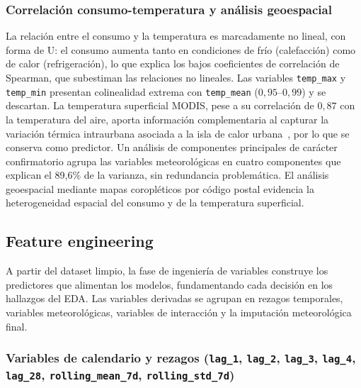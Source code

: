 \documentclass[12pt, a4paper]{article}
\begin{document}
\subsubsection{Correlación consumo-temperatura y análisis geoespacial}

La relación entre el consumo y la temperatura es marcadamente no lineal, con forma de U: el consumo aumenta tanto en condiciones de frío (calefacción) como de calor (refrigeración), lo que explica los bajos coeficientes de correlación de Spearman, que subestiman las relaciones no lineales. Las variables \texttt{temp\_max} y \texttt{temp\_min} presentan colinealidad extrema con \texttt{temp\_mean} ($0{,}95$--$0{,}99$) y se descartan. La temperatura superficial MODIS, pese a su correlación de $0{,}87$ con la temperatura del aire, aporta información complementaria al capturar la variación térmica intraurbana asociada a la isla de calor urbana~\cite{salvati2017}, por lo que se conserva como predictor. Un análisis de componentes principales de carácter confirmatorio agrupa las variables meteorológicas en cuatro componentes que explican el 89,6\% de la varianza, sin redundancia problemática. El análisis geoespacial mediante mapas coropléticos por código postal evidencia la heterogeneidad espacial del consumo y de la temperatura superficial.

\subsection{Feature engineering}

A partir del dataset limpio, la fase de ingeniería de variables construye los predictores que alimentan los modelos, fundamentando cada decisión en los hallazgos del EDA. Las variables derivadas se agrupan en rezagos temporales, variables meteorológicas, variables de interacción y la imputación meteorológica final.

\subsubsection{Variables de calendario y rezagos (\texttt{lag\_1}, \texttt{lag\_2}, \texttt{lag\_3}, \texttt{lag\_4}, \texttt{lag\_28}, \texttt{rolling\_mean\_7d}, \texttt{rolling\_std\_7d})}
\end{document}
